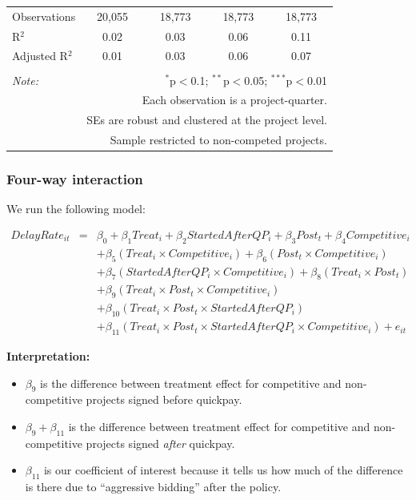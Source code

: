 \documentclass[
]{article}
\providecommand{\tightlist}{%
  \setlength{\itemsep}{0pt}\setlength{\parskip}{0pt}}
\begin{document}
\begin{table}[H]
\begin{tabular}{@{\extracolsep{-2pt}}lcccc}
Observations & 20,055 & 18,773 & 18,773 & 18,773 \\ 
R$^{2}$ & 0.02 & 0.03 & 0.06 & 0.11 \\ 
Adjusted R$^{2}$ & 0.01 & 0.03 & 0.06 & 0.07 \\ 
\hline 
\hline \\[-1.8ex] 
\textit{Note:}  & \multicolumn{4}{r}{$^{*}$p$<$0.1; $^{**}$p$<$0.05; $^{***}$p$<$0.01} \\ 
 & \multicolumn{4}{r}{Each observation is a project-quarter.} \\ 
 & \multicolumn{4}{r}{SEs are robust and clustered at the project level.} \\ 
 & \multicolumn{4}{r}{Sample restricted to non-competed projects.} \\ 
\end{tabular} 
\end{table}

\hypertarget{four-way-interaction}{%
\subsubsection{Four-way interaction}\label{four-way-interaction}}

We run the following model:

\[\begin{aligned} DelayRate_{it} &=& \beta_0 +\beta_1 Treat_i+ \beta_2 StartedAfterQP_i+ \beta_3 Post_t+ \beta_4 Competitive_i\\ && +  \beta_5 (Treat_i \times Competitive_i) + \beta_6 (Post_t \times Competitive_i)\\ && +  \beta_7 (StartedAfterQP_i \times Competitive_i) +\beta_8 (Treat_i \times Post_t)\\ && + \beta_9 (Treat_i \times Post_t \times Competitive_i) \\ && + \beta_{10} (Treat_i \times Post_t \times StartedAfterQP_i )\\ && + \beta_{11} (Treat_i \times Post_t \times StartedAfterQP_i \times Competitive_i) + e_{it} \end{aligned}\]

\textbf{Interpretation:}

\begin{itemize}
\tightlist
\item
  \(\beta_9\) is the difference between treatment effect for competitive
  and non-competitive projects signed before quickpay.
\item
  \(\beta_9 + \beta_{11}\) is the difference between treatment effect
  for competitive and non-competitive projects signed \emph{after}
  quickpay.
\item
  \(\beta_{11}\) is our coefficient of interest because it tells us how
  much of the difference is there due to ``aggressive bidding'' after
  the policy.
\end{itemize}
\end{document}

